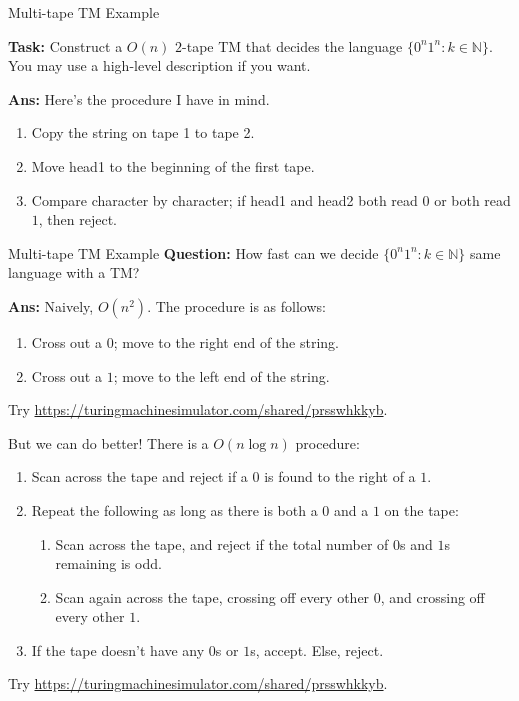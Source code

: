 \documentclass{beamer}
\newcommand{\N}{{\mathbb N}}
\begin{document}
\begin{frame}{Multi-tape TM Example}

\textbf{Task:} Construct a $O(n)$ $2$-tape TM that decides the language $\{0^n 1^n: k \in \N\}$. You may use a high-level description if you want.

\pause

\textbf{Ans:} Here's the procedure I have in mind.

\begin{enumerate}
    \item Copy the string on tape 1 to tape 2.
    \item Move head1 to the beginning of the first tape. 
    \item Compare character by character; if head1 and head2 both read $0$ or both read $1$, then reject.
\end{enumerate}

\end{frame}

\begin{frame}{Multi-tape TM Example}
\textbf{Question:} How fast can we decide $\{0^n 1^n: k \in \N\}$ same language with a TM?

\pause

\textbf{Ans:} Naively, $O(n^2)$. The procedure is as follows:
\begin{enumerate}
    \item Cross out a $0$; move to the right end of the string.
    \item Cross out a $1$; move to the left end of the string.
\end{enumerate}
Try \url{https://turingmachinesimulator.com/shared/prsswhkkyb}.

\vspace{2mm} \pause

But we can do better! There is a $O(n \log n)$ procedure:

\pause

\begin{enumerate}
    \item Scan across the tape and reject if a $0$ is found to the right of a $1$.
    \item Repeat the following as long as there is both a $0$ and a $1$ on the tape:
    \begin{enumerate}
        \item Scan across the tape, and reject if the total number of $0$s and $1$s remaining is odd.
        \item Scan again across the tape, crossing off every other $0$, and crossing off every other $1$.
    \end{enumerate}
    \item If the tape doesn't have any $0$s or $1$s, accept. Else, reject.
\end{enumerate}

\pause

Try \url{https://turingmachinesimulator.com/shared/prsswhkkyb}.

\end{frame}
\end{document}
